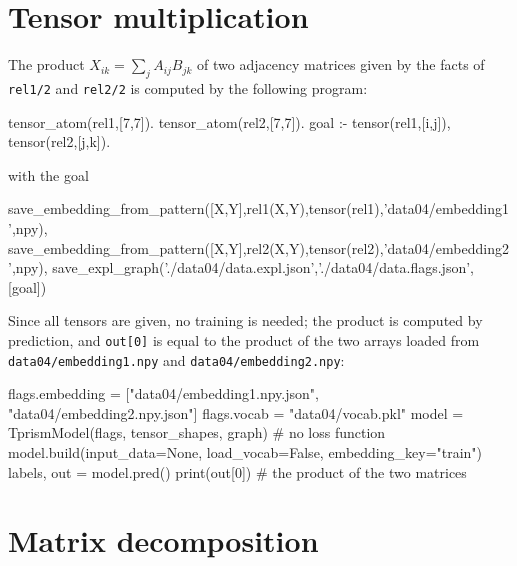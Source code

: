 \documentclass[a4paper]{report}
\begin{document}
\section{Tensor multiplication}
\label{sec:tutorial_matmul}

The product $X_{ik}=\sum_j A_{ij}B_{jk}$ of two adjacency matrices given
by the facts of {\tt rel1/2} and {\tt rel2/2} is computed by the following program:
\begin{prologcode}
tensor_atom(rel1,[7,7]).
tensor_atom(rel2,[7,7]).
goal :- tensor(rel1,[i,j]), tensor(rel2,[j,k]).
\end{prologcode}
with the goal
\begin{prologcode}
save_embedding_from_pattern([X,Y],rel1(X,Y),tensor(rel1),'data04/embedding1',npy),
save_embedding_from_pattern([X,Y],rel2(X,Y),tensor(rel2),'data04/embedding2',npy),
save_expl_graph('./data04/data.expl.json','./data04/data.flags.json',[goal])
\end{prologcode}
Since all tensors are given, no training is needed; the product is computed by
prediction, and {\tt out[0]} is equal to the product of the two arrays loaded
from {\tt data04/embedding1.npy} and {\tt data04/embedding2.npy}:
\begin{pythoncode}
flags.embedding = ["data04/embedding1.npy.json", "data04/embedding2.npy.json"]
flags.vocab = "data04/vocab.pkl"
model = TprismModel(flags, tensor_shapes, graph)    # no loss function
model.build(input_data=None, load_vocab=False, embedding_key="train")
labels, out = model.pred()
print(out[0])     # the product of the two matrices
\end{pythoncode}

\section{Matrix decomposition}
\label{sec:tutorial_decomposition}
\end{document}
